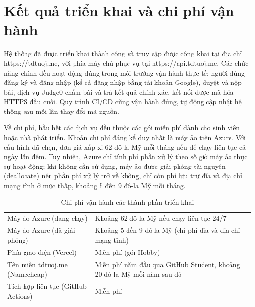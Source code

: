 \documentclass[12pt, a4paper]{report}
\begin{document}
\section{Kết quả triển khai và chi phí vận hành}

Hệ thống đã được triển khai thành công và truy cập được công khai tại địa chỉ
https://tdtuoj.me, với phía máy chủ phục vụ tại https://api.tdtuoj.me. Các
chức năng chính đều hoạt động đúng trong môi trường vận hành thực tế: người dùng đăng ký và
đăng nhập (kể cả đăng nhập bằng tài khoản Google), duyệt và nộp bài, dịch vụ Judge0 chấm bài
và trả kết quả chính xác, kết nối được mã hóa \ac{HTTPS} đầu cuối. Quy trình \ac{CI/CD} cũng
vận hành đúng, tự động cập nhật hệ thống sau mỗi lần thay đổi mã nguồn.

Về chi phí, hầu hết các dịch vụ đều thuộc các gói miễn phí dành cho sinh viên hoặc nhà phát
triển. Khoản chi phí đáng kể duy nhất là máy ảo trên Azure. Với cấu hình đã chọn, đơn giá
xấp xỉ 62 đô-la Mỹ mỗi tháng nếu để chạy liên tục cả ngày lẫn đêm. Tuy
nhiên, Azure chỉ tính phí phần xử lý theo số giờ máy ảo thực sự hoạt động; khi không cần
sử dụng, máy ảo được giải phóng tài nguyên (deallocate) nên phần phí xử lý trở về không,
chỉ còn phí lưu trữ đĩa và địa chỉ mạng tĩnh ở mức thấp, khoảng 5 đến 9
đô-la Mỹ mỗi tháng.

\begin{table}[H]
  \centering
  \begin{tabular}{|>{\raggedright\arraybackslash}p{4.5cm}|>{\raggedright\arraybackslash}p{8cm}|}
    \hline
    \multicolumn{1}{|c|}{\textbf{Thành phần}}
      & \multicolumn{1}{c|}{\textbf{Chi phí hằng tháng}} \\
    \hline
    Máy ảo Azure (đang chạy) & Khoảng 62 đô-la Mỹ nếu chạy liên tục 24/7 \\
    \hline
    Máy ảo Azure (đã giải phóng) & Khoảng 5 đến 9 đô-la Mỹ (chỉ phí đĩa và địa chỉ mạng tĩnh) \\
    \hline
    Phía giao diện (Vercel) & Miễn phí (gói Hobby) \\
    \hline
    Tên miền tdtuoj.me (Namecheap) & Miễn phí năm đầu qua GitHub Student, khoảng 20 đô-la Mỹ mỗi năm sau đó \\
    \hline
    Tích hợp liên tục (GitHub Actions) & Miễn phí \\
    \hline
  \end{tabular}
  \caption{Chi phí vận hành các thành phần triển khai}\label{tab:deploy-cost}
\end{table}
\end{document}

